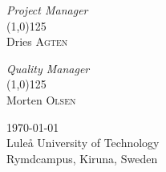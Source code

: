 \begin{titlepage}
\begin{center}
\vspace{1cm}

\begin{minipage}[t]{0.49\textwidth}
\begin{flushleft} \large
\emph{Project Manager}\\
\vspace{-1.2em}
\line(1,0){125}\\
Dries \textsc{Agten}
\end{flushleft}
\end{minipage}
\begin{minipage}[t]{0.49\textwidth}
\begin{flushright} \large
\emph{Quality Manager}\\
\vspace{-1.2em}
\line(1,0){125}\\
Morten \textsc{Olsen}\\[1cm]
\end{flushright}
\end{minipage}

\vfill

\begin{large}
\today \\
Lule\r{a} University of Technology \\
Rymdcampus, Kiruna, Sweden\\
\end{large}

\end{center}

\end{titlepage}